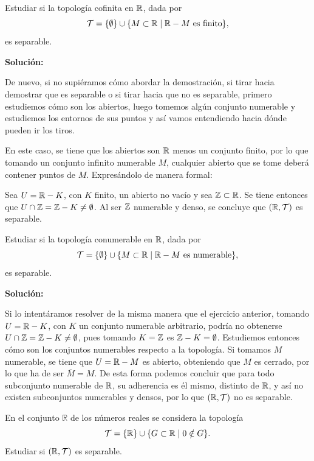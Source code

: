 \begin{ex}
    Estudiar si la topología cofinita en $\mathbb{R}$, dada por
    \[
        \mathcal{T} = \{\emptyset\} \cup \{M\subset\mathbb{R}\mid \mathbb{R}- M \text{ es finito}\},
    \]
    es separable.

    \bigskip

    {\bf Solución:}

    De nuevo, si no supiéramos cómo abordar la demostración, si tirar hacia demostrar que es separable o si tirar hacia que no es separable, primero estudiemos cómo son los abiertos, luego tomemos algún conjunto numerable y estudiemos los entornos de sus puntos y así vamos entendiendo hacia dónde pueden ir los tiros.

    En este caso, se tiene que los abiertos son $\mathbb{R}$ menos un conjunto finito, por lo que tomando un conjunto infinito numerable $M$, cualquier abierto que se tome deberá contener puntos de $M$. Expresándolo de manera formal:

    Sea $U = \mathbb{R} - K$, con $K$ finito, un abierto no vacío y sea $\mathbb{Z}\subset\mathbb{R}$. Se tiene entonces que $U\cap\mathbb{Z} = \mathbb{Z} - K \neq \emptyset$. Al ser $\mathbb{Z}$ numerable y denso, se concluye que $(\mathbb{R}, \mathcal{T})$ es separable.
\end{ex}

\begin{ex}
    Estudiar si la topología conumerable en $\mathbb{R}$, dada por
    \[
        \mathcal{T} = \{\emptyset\} \cup \{M\subset\mathbb{R}\mid \mathbb{R}- M \text{ es numerable}\},
    \]
    es separable.
    
    \bigskip

    {\bf Solución:}

    Si lo intentáramos resolver de la misma manera que el ejercicio anterior, tomando $U = \mathbb{R} - K$, con $K$ un conjunto numerable arbitrario, podría no obtenerse $U\cap\mathbb{Z} = \mathbb{Z} - K \neq \emptyset$, pues tomando $K = \mathbb{Z}$ es $\mathbb{Z} - K = \emptyset$. Estudiemos entonces cómo son los conjuntos numerables respecto a la topología. Si tomamos $M$ numerable, se tiene que $U = \mathbb{R} - M$ es abierto, obteniendo que $M$ es cerrado, por lo que ha de ser $\overline{M} = M$. De esta forma podemos concluir que para todo subconjunto numerable de $\mathbb{R}$, su adherencia es él mismo, distinto de $\mathbb{R}$, y así no existen subconjuntos numerables y densos, por lo que $(\mathbb{R}, \mathcal{T})$ no es separable.
\end{ex}

\begin{ex}
    En el conjunto \(\mathbb{R}\) de los números reales se considera la topología
    \[
        \mathcal{T} = \{\mathbb{R}\} \cup \{G \subset \mathbb{R} \mid 0 \notin G\}.
    \]
    Estudiar si \((\mathbb{R}, \mathcal{T})\) es separable.
\end{ex}

